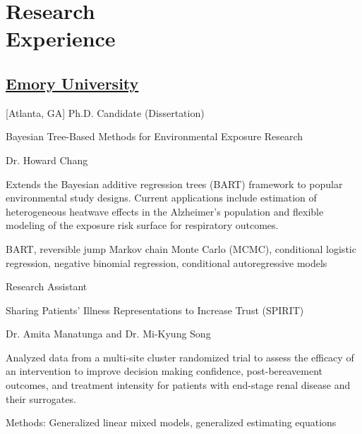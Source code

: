 \section{Research \\ Experience}

\subsection{\href{https://www.emory.edu/home/index.html}{Emory University}}[Atlanta, GA]
\vspace{-\parskip}
Ph.D. Candidate (Dissertation) \hfill {} \\
    \begin{description}[leftmargin=!,labelwidth=1.0em,labelindent=1.0em]
    \item[Title:] Bayesian Tree-Based Methods for Environmental Exposure Research
    \item[Advisor:] Dr. Howard Chang
    \item[Description:] Extends the Bayesian additive regression trees (BART) framework to popular environmental study designs. Current applications include estimation of heterogeneous heatwave effects in the Alzheimer's population and flexible modeling of the exposure risk surface for respiratory outcomes.
    \item[Methods:] BART, reversible jump Markov chain Monte Carlo (MCMC), conditional logistic regression, negative binomial regression, conditional autoregressive models
    \end{description}

Research Assistant \hfill {} \\
    \begin{description}[leftmargin=!,labelwidth=1.0em,labelindent=1.0em]
    \item[Title:] Sharing Patients' Illness Representations to Increase Trust (SPIRIT)
    \item[Advisors:] Dr. Amita Manatunga and Dr. Mi-Kyung Song
    \item[Description:] Analyzed data from a multi-site cluster randomized trial to assess the efficacy of an intervention to improve decision making confidence, post-bereavement outcomes, and treatment intensity for patients with end-stage renal disease and their surrogates. 
    \end{description}
    \vspace{-\parskip}
    \indent \quad Methods: Generalized linear mixed models, generalized estimating equations

